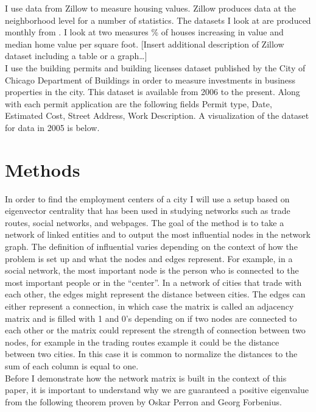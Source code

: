 \documentclass{article}
\theoremstyle{definition}
\theoremstyle{remark}
\begin{document}
I use data from Zillow to measure housing values.  Zillow produces data at the neighborhood level for a number of statistics.  The datasets I look at are produced monthly from .  I look at two measures \% of houses increasing in value and median home value per square foot.
[Insert additional description of Zillow dataset including a table or a graph…]\\

I use the building permits and building licenses dataset published by the City of Chicago Department of Buildings in order to measure investments in business properties in the city.  This dataset is available from 2006 to the present.  Along with each permit application are the following fields Permit type, Date, Estimated Cost, Street Address, Work Description.  A visualization of the dataset for data in 2005 is below.


\section{Methods}
In order to find the employment centers of a city I will use a setup based on eigenvector centrality that has been used in studying networks such as trade routes, social networks, and webpages.  The goal of the method is to take a network of linked entities and to output the most influential nodes in the network graph.  The definition of influential varies depending on the context of how the problem is set up and what the nodes and edges represent.  For example, in a social network, the most important node is the person who is connected to the most important people or in the “center”.  In a network of cities that trade with each other, the edges might represent the distance between cities.  The edges can either represent a connection, in which case the matrix is called an adjacency matrix and is filled with 1 and 0’s depending on if two nodes are connected to each other or the matrix could represent the strength of connection between two nodes, for example in the trading routes example it could be the distance between two cities.  In this case it is common to normalize the distances to the sum of each column is equal to one. \\

Before I demonstrate how the network matrix is built in the context of this paper, it is important to understand why we are guaranteed a positive eigenvalue from the following theorem proven by Oskar Perron and Georg Forbenius.
\end{document}

